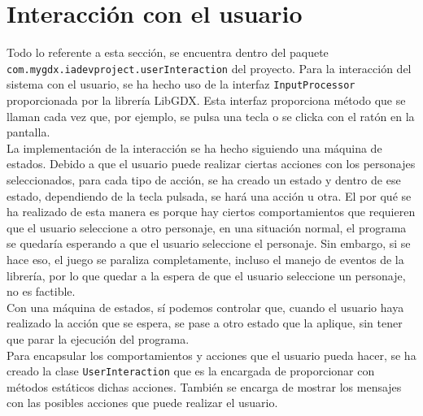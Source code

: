\medskip
\section{Interacción con el usuario}
\label{interaccion}
Todo lo referente a esta sección, se encuentra dentro del paquete \texttt{com.mygdx.iadevproject.userInteraction} del proyecto. Para la interacción del sistema con el usuario, se ha hecho uso de la interfaz \texttt{InputProcessor} proporcionada por la librería LibGDX. Esta interfaz proporciona método que se llaman cada vez que, por ejemplo, se pulsa una tecla o se clicka con el ratón en la pantalla. \\

La implementación de la interacción se ha hecho siguiendo una máquina de estados. Debido a que el usuario puede realizar ciertas acciones con los personajes seleccionados, para cada tipo de acción, se ha creado un estado y dentro de ese estado, dependiendo de la tecla pulsada, se hará una acción u otra. El por qué se ha realizado de esta manera es porque hay ciertos comportamientos que requieren que el usuario seleccione a otro personaje, en una situación normal, el programa se quedaría esperando a que el usuario seleccione el personaje. Sin embargo, si se hace eso, el juego se paraliza completamente, incluso el manejo de eventos de la librería, por lo que quedar a la espera de que el usuario seleccione un personaje, no es factible. \\

Con una máquina de estados, sí podemos controlar que, cuando el usuario haya realizado la acción que se espera, se pase a otro estado que la aplique, sin tener que parar la ejecución del programa. \\

Para encapsular los comportamientos y acciones que el usuario pueda hacer, se ha creado la clase \texttt{UserInteraction} que es la encargada de proporcionar con métodos estáticos dichas acciones. También se encarga de mostrar los mensajes con las posibles acciones que puede realizar el usuario.